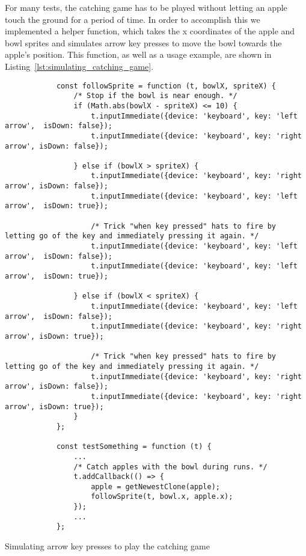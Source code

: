 For many tests, the catching game has to be played without letting an apple touch the ground for a period of time.
In order to accomplish this we implemented a helper function,
which takes the x coordinates of the apple and bowl sprites and
simulates arrow key presses to move the bowl towards the apple's position.
This function, as well as a usage example, are shown in Listing~\ref{lst:simulating_catching_game}.

\begin{listing}[htpb]
    \centering
    \begin{minipage}{.85\textwidth}
        \begin{verbatim}
            const followSprite = function (t, bowlX, spriteX) {
                /* Stop if the bowl is near enough. */
                if (Math.abs(bowlX - spriteX) <= 10) {
                    t.inputImmediate({device: 'keyboard', key: 'left arrow',  isDown: false});
                    t.inputImmediate({device: 'keyboard', key: 'right arrow', isDown: false});

                } else if (bowlX > spriteX) {
                    t.inputImmediate({device: 'keyboard', key: 'right arrow', isDown: false});
                    t.inputImmediate({device: 'keyboard', key: 'left arrow',  isDown: true});

                    /* Trick "when key pressed" hats to fire by letting go of the key and immediately pressing it again. */
                    t.inputImmediate({device: 'keyboard', key: 'left arrow',  isDown: false});
                    t.inputImmediate({device: 'keyboard', key: 'left arrow',  isDown: true});

                } else if (bowlX < spriteX) {
                    t.inputImmediate({device: 'keyboard', key: 'left arrow',  isDown: false});
                    t.inputImmediate({device: 'keyboard', key: 'right arrow', isDown: true});

                    /* Trick "when key pressed" hats to fire by letting go of the key and immediately pressing it again. */
                    t.inputImmediate({device: 'keyboard', key: 'right arrow', isDown: false});
                    t.inputImmediate({device: 'keyboard', key: 'right arrow', isDown: true});
                }
            };

            const testSomething = function (t) {
                ...
                /* Catch apples with the bowl during runs. */
                t.addCallback(() => {
                    apple = getNewestClone(apple);
                    followSprite(t, bowl.x, apple.x);
                });
                ...
            };
        \end{verbatim}
    \end{minipage}

    \caption{Simulating arrow key presses to play the catching game}
    \label{lst:simulating_catching_game}
\end{listing}

